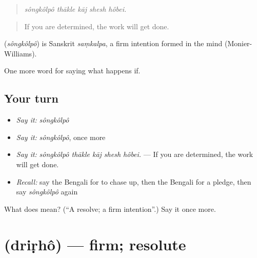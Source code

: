 \begin{quote}
    
\end{quote}

\begin{quote}
\emph{sôngkôlpô thākle kāj shesh hôbei.}
\end{quote}

\begin{quote}
If you are determined, the work will get done.
\end{quote}

\begin{cousinweb}
\textbf{} (\emph{sôngkôlpô}) is Sanskrit \emph{saṃkalpa}, a firm intention formed in the mind (Monier-Williams).
\end{cousinweb}

\begin{grammarlens}[title={What you've built}]
One more word for saying what happens if.
\end{grammarlens}

\subsection*{Your turn}
\begin{itemize}
\raggedright
  \item \emph{Say it:} \emph{sôngkôlpô}
  \item \emph{Say it:} \emph{sôngkôlpô}, once more
  \item \emph{Say it:} \emph{sôngkôlpô thākle kāj shesh hôbei.} — If you are determined, the work will get done.
  \item \emph{Recall:} say the Bengali for to chase up, then the Bengali for a pledge, then say \emph{sôngkôlpô} again
\end{itemize}

\begin{tcolorbox}[breakable,colback=teal!4,colframe=teal!35!black,title={Before you move on}]
What does  mean? (\textquotedblleft{}A resolve; a firm intention\textquotedblright{}.) Say it once more.
\end{tcolorbox}
\section[\texorpdfstring{\bn{দৃঢ়} (driṛhô)}{দৃঢ় (driṛhô)}]{ (driṛhô) — firm; resolute}

\label{lesson:BN-C379-drirho}



